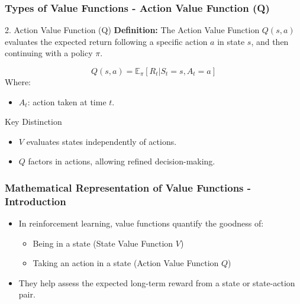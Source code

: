 \documentclass[aspectratio=169]{beamer}
\begin{document}
\begin{frame}[fragile]
    \frametitle{Types of Value Functions - Action Value Function (Q)}
    \begin{block}{2. Action Value Function (Q)}
        \textbf{Definition:} The Action Value Function \( Q(s, a) \) evaluates the expected return following a specific action \( a \) in state \( s \), and then continuing with a policy \( \pi \).
    \end{block}
    \begin{equation}
        Q(s, a) = \mathbb{E}_{\pi}[R_t | S_t = s, A_t = a]
    \end{equation}
    Where:
    \begin{itemize}
        \item \( A_t \): action taken at time \( t \).
    \end{itemize}
    \begin{block}{Key Distinction}
        \begin{itemize}
            \item \( V \) evaluates states independently of actions.
            \item \( Q \) factors in actions, allowing refined decision-making.
        \end{itemize}
    \end{block}
\end{frame}

\begin{frame}[fragile]
    \frametitle{Mathematical Representation of Value Functions - Introduction}
    \begin{itemize}
        \item In reinforcement learning, value functions quantify the goodness of:
        \begin{itemize}
            \item Being in a state (State Value Function \(V\))
            \item Taking an action in a state (Action Value Function \(Q\))
        \end{itemize}
        \item They help assess the expected long-term reward from a state or state-action pair.
    \end{itemize}
\end{frame}
\end{document}

